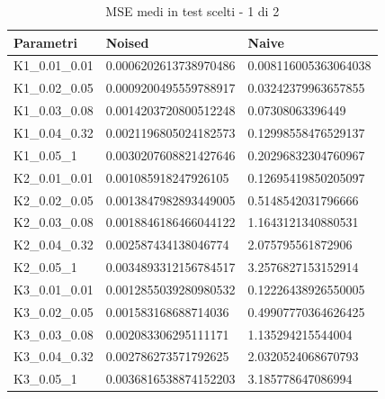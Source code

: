 \documentclass[12pt]{article}
\begin{document}
    \begin{table}[!ht]
    \centering
    \begin{tabular}{|l|l|l|}
    \hline
        Parametri & Noised & Naive \\ \hline
        K1\_0.01\_0.01 & 0.0006202613738970486 & 0.008116005363064038 \\ \hline
        K1\_0.02\_0.05 & 0.0009200495559788917 & 0.03242379963657855 \\ \hline
        K1\_0.03\_0.08 & 0.0014203720800512248 & 0.07308063396449 \\ \hline
        K1\_0.04\_0.32 & 0.0021196805024182573 & 0.12998558476529137 \\ \hline
        K1\_0.05\_1 & 0.0030207608821427646 & 0.20296832304760967 \\ \hline
        K2\_0.01\_0.01 & 0.001085918247926105 & 0.12695419850205097 \\ \hline
        K2\_0.02\_0.05 & 0.0013847982893449005 & 0.5148542031796666 \\ \hline
        K2\_0.03\_0.08 & 0.0018846186466044122 & 1.1643121340880531 \\ \hline
        K2\_0.04\_0.32 & 0.002587434138046774 & 2.075795561872906 \\ \hline
        K2\_0.05\_1 & 0.0034893312156784517 & 3.2576827153152914 \\ \hline
        K3\_0.01\_0.01 & 0.0012855039280980532 & 0.12226438926550005 \\ \hline
        K3\_0.02\_0.05 & 0.001583168688714036 & 0.49907770364626425 \\ \hline
        K3\_0.03\_0.08 & 0.002083306295111171 & 1.135294215544004 \\ \hline
        K3\_0.04\_0.32 & 0.002786273571792625 & 2.0320524068670793 \\ \hline
        K3\_0.05\_1 & 0.0036816538874152203 & 3.185778647086994 \\ \hline
    \end{tabular}
    \caption{MSE medi in test scelti - 1 di 2}
    \label{table:4}
    \end{table}
\end{document}
